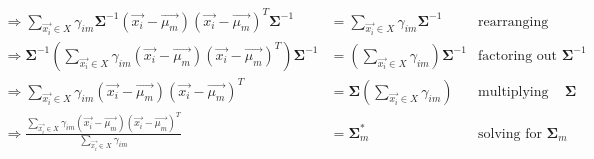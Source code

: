 \documentclass[11pt, fleqn]{article}
\begin{document}
\begin{enumerate}
\begin{align*}
        \Rightarrow \sum_{\vec{x_i} \in X} \gamma_{im} \boldsymbol{\Sigma}^{-1} (\vec{x_i} - \vec{\mu_m})(\vec{x_i} - \vec{\mu_m})^T \boldsymbol{\Sigma}^{-1} &= \sum_{\vec{x_i} \in X} \gamma_{im} \boldsymbol{\Sigma}^{-1} & \text{rearranging} \\
        \Rightarrow \boldsymbol{\Sigma}^{-1} \left( \sum_{\vec{x_i} \in X} \gamma_{im} (\vec{x_i} - \vec{\mu_m})(\vec{x_i} - \vec{\mu_m})^T \right) \boldsymbol{\Sigma}^{-1} &= \left( \sum_{\vec{x_i} \in X} \gamma_{im} \right) \boldsymbol{\Sigma}^{-1}  & \text{factoring out } \boldsymbol{\Sigma}^{-1} \\
        \Rightarrow \sum_{\vec{x_i} \in X} \gamma_{im} (\vec{x_i} - \vec{\mu_m})(\vec{x_i} - \vec{\mu_m})^T &= \boldsymbol{\Sigma} \left( \sum_{\vec{x_i} \in X} \gamma_{im} \right) & \text{multiplying both sides by } \boldsymbol{\Sigma} \\
        \Rightarrow \frac{\sum_{\vec{x_i} \in X} \gamma_{im} (\vec{x_i} - \vec{\mu_m})(\vec{x_i} - \vec{\mu_m})^T}{\sum_{\vec{x_i} \in X} \gamma_{im}} &= \boldsymbol{\Sigma}_m^* & \text{solving for } \boldsymbol{\Sigma}_m \\
    \end{align*}
\end{enumerate}

\newpage
\end{document}
